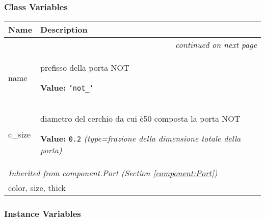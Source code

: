 
  \subsubsection{Class Variables}

    \vspace{-1cm}
\hspace{\varindent}\begin{longtable}{|p{\varnamewidth}|p{\vardescrwidth}|l}
\cline{1-2}
\cline{1-2} \centering \textbf{Name} & \centering \textbf{Description}& \\
\cline{1-2}
\endhead\cline{1-2}\multicolumn{3}{r}{\small\textit{continued on next page}}\\\endfoot\cline{1-2}
\endlastfoot\raggedright n\-a\-m\-e\- & \raggedright prefisso della porta NOT

\textbf{Value:} 
{\tt \texttt{'}\texttt{not\_}\texttt{'}}&\\
\cline{1-2}
\raggedright c\-\_\-s\-i\-z\-e\- & \raggedright diametro del cerchio da cui è50 composta la porta NOT

\textbf{Value:} 
{\tt 0.2}            {\it (type=frazione della dimensione totale della porta)}&\\
\cline{1-2}
\multicolumn{2}{|l|}{\textit{Inherited from component.Port \textit{(Section \ref{component:Port})}}}\\
\multicolumn{2}{|p{\varwidth}|}{\raggedright color, size, thick}\\
\cline{1-2}
\end{longtable}



  \subsubsection{Instance Variables}


